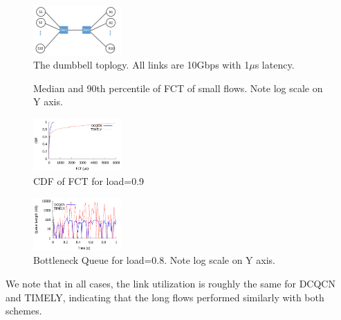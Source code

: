 \begin{figure}[t]
\center
\includegraphics[width=0.3\textwidth]{figures/dumbbell.pdf}
\caption{The dumbbell toplogy. All links are 10Gbps with 1$\mu$s latency.}
\label{fig:fct_topo}
\end{figure}

\begin{figure}[t]
\center
{}
\caption{Median and 90th percentile of FCT of small flows. Note log scale on Y axis.}
\label{fig:fct_results}
\end{figure}

\begin{figure}[t]
\center
\includegraphics[width=0.3\textwidth]{figures/fct_cdf.pdf}
\caption{CDF of FCT for load=0.9}
\label{fig:fct_cdf}
\end{figure}

\begin{figure}[t]
\center
\includegraphics[width=0.3\textwidth]{figures/fct_queue.pdf}
\caption{Bottleneck Queue for load=0.8. Note log scale on Y axis.}
\label{fig:fct_queue}
\end{figure}

We note that in all cases, the link utilization is roughly the same for DCQCN
and TIMELY, indicating that the long flows performed similarly with both
schemes.
